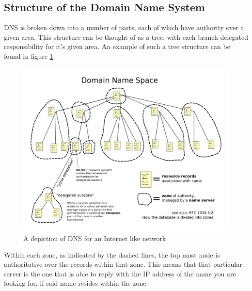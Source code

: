 \documentclass[a4paper,11pt]{report}
\begin{document}
		\subsection{Structure of the Domain Name System}
			DNS is broken down into a number of parts, each of which have authority over a given area. 
			This structure can be thought of as a tree, with each branch delegated responsibility for it's given area. 
			An example of such a tree structure can be found in figure \ref{fig:DNSTree}.

			\begin{figure}[htb]
				\centering
					\includegraphics[scale=0.27]{./DNSTree.png}
					\caption{A depiction of DNS for an Internet like network}
					\label{fig:DNSTree}
			\end{figure}

			Within each zone, as indicated by the dashed lines, the top most node is authoritative over the records within that zone. 
			This means that that particular server is the one that is able to reply with the IP address of the name you are looking for, if said name resides within the zone. 
\end{document}
